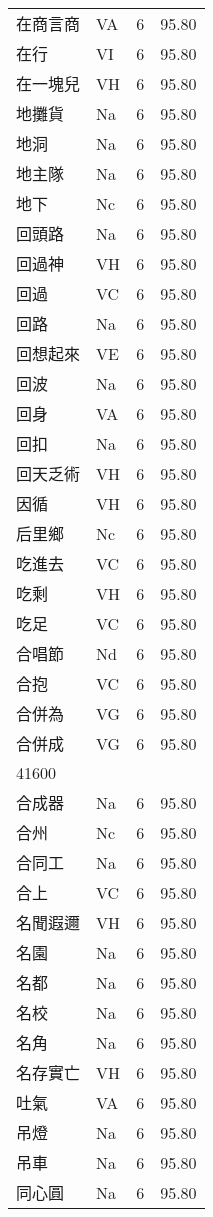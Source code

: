 \documentclass[twocolumn]{book}
\begin{document}
\begin{supertabular}{llrr}
在商言商 & VA & 6 &  95.80\\
在行 & VI & 6 &  95.80\\
在一塊兒 & VH & 6 &  95.80\\
地攤貨 & Na & 6 &  95.80\\
地洞 & Na & 6 &  95.80\\
地主隊 & Na & 6 &  95.80\\
地下 & Nc & 6 &  95.80\\
回頭路 & Na & 6 &  95.80\\
回過神 & VH & 6 &  95.80\\
回過 & VC & 6 &  95.80\\
回路 & Na & 6 &  95.80\\
回想起來 & VE & 6 &  95.80\\
回波 & Na & 6 &  95.80\\
回身 & VA & 6 &  95.80\\
回扣 & Na & 6 &  95.80\\
回天乏術 & VH & 6 &  95.80\\
因循 & VH & 6 &  95.80\\
后里鄉 & Nc & 6 &  95.80\\
吃進去 & VC & 6 &  95.80\\
吃剩 & VH & 6 &  95.80\\
吃足 & VC & 6 &  95.80\\
合唱節 & Nd & 6 &  95.80\\
合抱 & VC & 6 &  95.80\\
合併為 & VG & 6 &  95.80\\
合併成 & VG & 6 &  95.80\\
41600\\
合成器 & Na & 6 &  95.80\\
合州 & Nc & 6 &  95.80\\
合同工 & Na & 6 &  95.80\\
合上 & VC & 6 &  95.80\\
名聞遐邇 & VH & 6 &  95.80\\
名園 & Na & 6 &  95.80\\
名都 & Na & 6 &  95.80\\
名校 & Na & 6 &  95.80\\
名角 & Na & 6 &  95.80\\
名存實亡 & VH & 6 &  95.80\\
吐氣 & VA & 6 &  95.80\\
吊燈 & Na & 6 &  95.80\\
吊車 & Na & 6 &  95.80\\
同心圓 & Na & 6 &  95.80\\

\end{supertabular}
\end{document}
